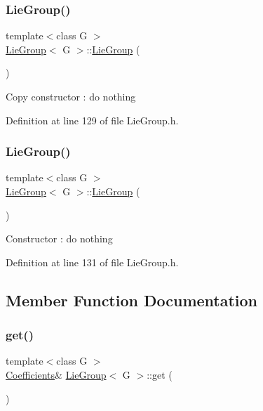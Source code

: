\subsubsection{\texorpdfstring{Lie\+Group()}{LieGroup()}\hspace{0.1cm}{\footnotesize\ttfamily [1/2]}}
{\footnotesize\ttfamily template$<$class G $>$ \\
\hyperlink{class_lie_group}{Lie\+Group}$<$ G $>$\+::\hyperlink{class_lie_group}{Lie\+Group} (\begin{DoxyParamCaption}\item[{const \hyperlink{class_lie_group}{Lie\+Group}$<$ G $>$ \&}]{ }\end{DoxyParamCaption})\hspace{0.3cm}{\ttfamily [inline]}}

Copy constructor \+: do nothing 

Definition at line 129 of file Lie\+Group.\+h.

\hypertarget{class_lie_group_ac831365f2877426d28524f26ab771525}{}\label{class_lie_group_ac831365f2877426d28524f26ab771525} 
\subsubsection{\texorpdfstring{Lie\+Group()}{LieGroup()}\hspace{0.1cm}{\footnotesize\ttfamily [2/2]}}
{\footnotesize\ttfamily template$<$class G $>$ \\
\hyperlink{class_lie_group}{Lie\+Group}$<$ G $>$\+::\hyperlink{class_lie_group}{Lie\+Group} (\begin{DoxyParamCaption}{ }\end{DoxyParamCaption})\hspace{0.3cm}{\ttfamily [inline]}}

Constructor \+: do nothing 

Definition at line 131 of file Lie\+Group.\+h.



\subsection{Member Function Documentation}
\hypertarget{class_lie_group_ac8a00eee2b7425186ddf51dbf2e62f14}{}\label{class_lie_group_ac8a00eee2b7425186ddf51dbf2e62f14} 
\subsubsection{\texorpdfstring{get()}{get()}\hspace{0.1cm}{\footnotesize\ttfamily [1/2]}}
{\footnotesize\ttfamily template$<$class G $>$ \\
\hyperlink{class_lie_group_a52de3c5adb933cbfa694b51bef656d5d}{Coefficients}\& \hyperlink{class_lie_group}{Lie\+Group}$<$ G $>$\+::get (\begin{DoxyParamCaption}{ }\end{DoxyParamCaption})\hspace{0.3cm}{\ttfamily [inline]}}

